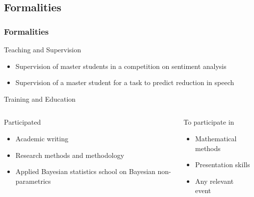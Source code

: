 \documentclass{beamer}
\begin{document}
\begin{frame}\section{Formalities}
    \frametitle{Formalities}

    \begin{block}{Teaching and Supervision}
        \begin{itemize}
            \item Supervision of master students in a competition on sentiment analysis
            \item Supervision of a master student for a task to predict reduction in speech
        \end{itemize}
    \end{block}

    \begin{block}{Training and Education}
        \begin{columns}
            \begin{column}{0.5\textwidth}
                \begin{block}{Participated}
                    \begin{itemize}
                        \item Academic writing
                        \item Research methods and methodology
                        \item Applied Bayesian statistics school on Bayesian non-parametrics
                    \end{itemize}
                \end{block}
            \end{column}    
            \begin{column}{0.5\textwidth}
                \begin{block}{To participate in}
                    \begin{itemize}
                        \item Mathematical methods
                        \item Presentation skills
                        \item Any relevant event
                    \end{itemize}
                \end{block}
            \end{column}    
        \end{columns}
    \end{block}
\end{frame}
\end{document}
